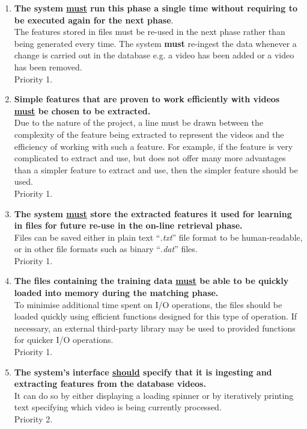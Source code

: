 \begin{enumerate}[label=F\arabic*]

    \item \textbf{The system \underline{must} run this phase a single time without requiring to be executed again for the next phase}.\\
    The features stored in files must be re-used in the next phase rather than being generated every time. The system \textbf{must} re-ingest the data whenever a change is carried out in the database e.g. a video has been added or a video has been removed.\\
    Priority 1.
    
    \item \textbf{Simple features that are proven to work efficiently with videos \underline{must} be chosen to be extracted.}\\
    Due to the nature of the project, a line must be drawn between the complexity of the feature being extracted to represent the videos and the efficiency of working with such a feature. For example, if the feature is very complicated to extract and use, but does not offer many more advantages than a simpler feature to extract and use, then the simpler feature should be used.\\
    Priority 1.
    
    \item \textbf{The system \underline{must} store the extracted features it used for learning in files for future re-use in the on-line retrieval phase.}\\
    Files can be saved either in plain text ``\textit{.txt}'' file format to be human-readable, or in other file formats such as binary ``\textit{.dat}'' files.\\
    Priority 1.
    
    \item \textbf{The files containing the training data \underline{must} be able to be quickly loaded into memory during the matching phase.}\\
    To minimise additional time spent on I/O operations, the files should be loaded quickly using efficient functions designed for this type of operation. If necessary, an external third-party library may be used to provided functions for quicker I/O operations.\\
    Priority 1.
    
    \item \textbf{The system's interface \underline{should} specify that it is ingesting and extracting features from the database videos.}\\
    It can do so by either displaying a loading spinner or by iteratively printing text specifying which video is being currently processed.\\
    Priority 2.
    
\end{enumerate}

